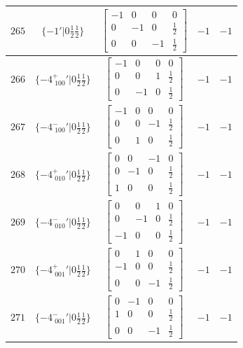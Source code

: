 \documentclass[fleqn,8pt]{jsarticle}
\begin{document}
\begin{longtable}{ccccc}
$ 265 $ & $ \{-1{}'|0 \frac{1}{2} \frac{1}{2}\} $ & $ \begin{bmatrix} -1 & 0 & 0 & 0 \\ 0 & -1 & 0 & \frac{1}{2} \\ 0 & 0 & -1 & \frac{1}{2} \end{bmatrix} $ & $ -1 $ & $ -1 $ \\ \hline
$ 266 $ & $ \{-4^{+}_{\,\,100}{}'|0 \frac{1}{2} \frac{1}{2}\} $ & $ \begin{bmatrix} -1 & 0 & 0 & 0 \\ 0 & 0 & 1 & \frac{1}{2} \\ 0 & -1 & 0 & \frac{1}{2} \end{bmatrix} $ & $ -1 $ & $ -1 $ \\ \hline
$ 267 $ & $ \{-4^{-}_{\,\,100}{}'|0 \frac{1}{2} \frac{1}{2}\} $ & $ \begin{bmatrix} -1 & 0 & 0 & 0 \\ 0 & 0 & -1 & \frac{1}{2} \\ 0 & 1 & 0 & \frac{1}{2} \end{bmatrix} $ & $ -1 $ & $ -1 $ \\ \hline
$ 268 $ & $ \{-4^{+}_{\,\,010}{}'|0 \frac{1}{2} \frac{1}{2}\} $ & $ \begin{bmatrix} 0 & 0 & -1 & 0 \\ 0 & -1 & 0 & \frac{1}{2} \\ 1 & 0 & 0 & \frac{1}{2} \end{bmatrix} $ & $ -1 $ & $ -1 $ \\ \hline
$ 269 $ & $ \{-4^{-}_{\,\,010}{}'|0 \frac{1}{2} \frac{1}{2}\} $ & $ \begin{bmatrix} 0 & 0 & 1 & 0 \\ 0 & -1 & 0 & \frac{1}{2} \\ -1 & 0 & 0 & \frac{1}{2} \end{bmatrix} $ & $ -1 $ & $ -1 $ \\ \hline
$ 270 $ & $ \{-4^{+}_{\,\,001}{}'|0 \frac{1}{2} \frac{1}{2}\} $ & $ \begin{bmatrix} 0 & 1 & 0 & 0 \\ -1 & 0 & 0 & \frac{1}{2} \\ 0 & 0 & -1 & \frac{1}{2} \end{bmatrix} $ & $ -1 $ & $ -1 $ \\ \hline
$ 271 $ & $ \{-4^{-}_{\,\,001}{}'|0 \frac{1}{2} \frac{1}{2}\} $ & $ \begin{bmatrix} 0 & -1 & 0 & 0 \\ 1 & 0 & 0 & \frac{1}{2} \\ 0 & 0 & -1 & \frac{1}{2} \end{bmatrix} $ & $ -1 $ & $ -1 $ \\ \hline

\end{longtable}
\end{document}
